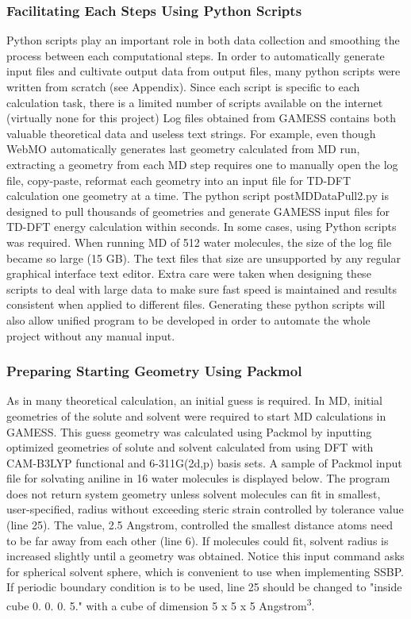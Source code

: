 \documentclass[
journal=jpcbfk, %
manuscript=article]{achemso}
\begin{document}
	\subsubsection{Facilitating Each Steps Using Python Scripts}
	Python scripts play an important role in both data collection and smoothing the process between each computational steps. In order to automatically generate input files and cultivate output data from output files, many python scripts were written from scratch (see Appendix). Since each script is specific to each calculation task, there is a limited number of scripts available on the internet (virtually none for this project) Log files obtained from GAMESS contains both valuable theoretical data and useless text strings.  For example, even though WebMO\cite{webmo} automatically generates last geometry calculated from MD run, extracting a geometry from each MD step requires one to manually open the log file, copy-paste, reformat each geometry into an input file for TD-DFT calculation one geometry at a time. The python script postMDDataPull2.py is designed to pull thousands of geometries and generate GAMESS input files for TD-DFT energy calculation within seconds. In some cases, using Python scripts was required. When running MD of 512 water molecules, the size of the log file became so large (15 GB). The text files that size are unsupported by any regular graphical interface text editor. Extra care were taken when designing these scripts to deal with large data to make sure fast speed is maintained and results consistent when applied to different files. Generating these python scripts will also allow unified program to be developed in order to automate the whole project without any manual input.
	
	\subsubsection{Preparing Starting Geometry Using Packmol} \label{step2}
	As in many theoretical calculation, an initial guess is required. In MD, initial geometries of the solute and solvent were required to start MD calculations in GAMESS. This guess geometry was calculated using Packmol by inputting optimized geometries of solute and solvent calculated from using DFT with CAM-B3LYP functional and 6-311G(2d,p) basis sets. A sample of Packmol input file for solvating aniline in 16 water molecules is displayed below. The program does not return system geometry unless solvent molecules can fit in smallest, user-specified, radius without exceeding steric strain controlled by tolerance value (line 25). The value, 2.5 Angstrom, controlled the smallest distance atoms need to be far away from each other (line 6). If molecules could fit, solvent radius is increased slightly until a geometry was obtained. Notice this input command asks for spherical solvent sphere, which is convenient to use when implementing SSBP. If periodic boundary condition is to be used, line 25 should be changed to "inside cube 0. 0. 0. 5." with a cube of dimension 5 x 5 x 5 Angstrom\textsuperscript{3}. 
	\inputminted[linenos, breaklines, baselinestretch=1, fontsize=\small]{Perl}{../PACKMOLinp/aniline16.inp}
	
\end{document}
